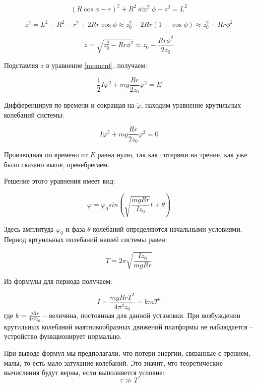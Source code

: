 \documentclass[a4paper]{article}
\begin{document}
\begin{center}
    \[ (R\cos\phi - r)^2 + R^2\sin^2\phi + z^2 = L^2 \]
    
    \[ z^2 = L^2 - R^2 - r^2 + 2Rr\cos\phi \approx z^2_{0} - 2Rr(1 - \cos\phi) \approx z^2_{0} - Rr\phi^2 \]
    
    \[ z = \sqrt{z^2_{0} - Rr\phi^2} \approx z_{0} - \frac{Rr\phi^2}{2z_{0}}\]
\end{center}

Подставляя $z$ в уравнение \eqref{moment}, получаем:

\begin{equation}
    \frac{1}{2}I\dot{\varphi^2} + mg \frac{Rr}{2z_0}\varphi^2 = E
\end{equation}

Дифференцируя по времени и сокращая на $\dot\varphi$, находим уравнение крутильных колебаний системы:

\begin{equation}
    I\ddot\varphi^2 + mg\frac{Rr}{2z_0}\varphi^2 = 0
\end{equation}
    
Производная по времени от $E$ равна нулю, так как потерями на трение, как уже было сказано выше, пренебрегаем.

Решение этого уравнения имеет вид:

\begin{equation}
    \varphi = \varphi_0 sin \left(\sqrt{\frac{mgRr}{Iz_0}}t + \theta\right)
\end{equation}

Здесь амплитуда $\varphi_0$ и фаза $\theta$ колебаний определяются начальными условиями. Период кртуильных полебаний нашей системы равен:

\begin{equation}
    T = 2\pi \sqrt{\frac{Iz_0}{mgRr}}
\end{equation}

Из формулы для периода получаем:

\begin{equation}\label{momin}
    I = \frac{mgRrT^2}{4 \pi^2z_0} = kmT^2
\end{equation}
\noindent где $k = \frac{gRr}{4\pi^2z_0}$ -- величина, постоянная для данной установки.
При возбуждении крутильных колебаний маятникообразных движений платформы не наблюдается -- устройство функционирует нормально.

При выводе формул мы предполагали, что потери энергии, связанные с трением, малы, то есть мало затухание колебаний. Это значит, что теоретические вычисления будут верны, если выполняется условие:
 \begin{equation}
    \tau \gg T
\end{equation}
\end{document}
